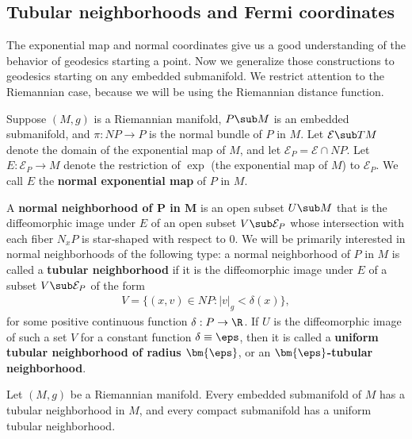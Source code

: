 \subsection{Tubular neighborhoods and Fermi coordinates}
The exponential map and normal coordinates give us a good understanding of the behavior of geodesics starting a point. Now we generalize those constructions to geodesics 
starting on any embedded submanifold. We restrict attention to the Riemannian case, because we will be using the Riemannian distance function.\par
Suppose $(M,g)$ is a Riemannian manifold, $P\sub M$ is an embedded submanifold, and $\pi:NP\to P$ is the normal bundle of $P$ in $M$. Let $\mathcal{E}\sub TM$ denote 
the domain of the exponential map of $M$, and let $\mathcal{E}_P=\mathcal{E}\cap NP$. Let $E:\mathcal{E}_P\to M$ denote the restriction of $\exp$ 
(the exponential map of $M$) to $\mathcal{E}_P$. We call $E$ the \textbf{normal exponential map} of $P$ in $M$.\par
A \textbf{normal neighborhood of $\bm{P}$ in $\bm{M}$} is an open subset $U\sub M$ that is the diffeomorphic image under $E$ of an open subset $V\sub\mathcal{E}_P$ whose 
intersection with each fiber $N_xP$ is star-shaped with respect to $0$. We will be primarily interested in normal neighborhoods of the following type: a normal 
neighborhood of $P$ in $M$ is called a \textbf{tubular neighborhood} if it is the diffeomorphic image under $E$ of a subset $V\sub\mathcal{E}_P$ of the form
\begin{align}\label{Riemann tubular neighbrhood-1}
V=\{(x,v)\in NP:|v|_g<\delta(x)\},
\end{align}
for some positive continuous function $\delta:P\to\R$. If $U$ is the diffeomorphic image of such a set $V$ for a constant function $\delta\equiv\eps$, then it is called 
a \textbf{uniform tubular neighborhood of radius $\bm{\eps}$}, or an \textbf{$\bm{\eps}$-tubular neighborhood}.
\begin{theorem}\label{Riemann tubular neighborhood}
Let $(M,g)$ be a Riemannian manifold. Every embedded submanifold of $M$ has a tubular neighborhood in $M$, and every compact submanifold has a uniform tubular 
neighborhood.
\end{theorem}
